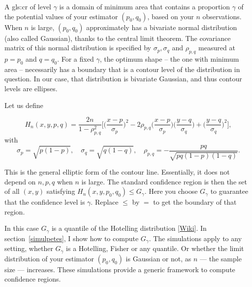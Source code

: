 \documentclass[oneside,10pt]{book}
\begin{document}
A \gls{gls:cr} of level $\gamma$ is a domain of minimum area that contains a proportion $\gamma$ of the potential values of your estimator $(p_0, q_0)$, based on your $n$ observations. When $n$ is large, $(p_0, q_0)$ approximately has a \textcolor{index}{bivariate normal distribution} (also called Gaussian), thanks to the 
\textcolor{index}{central limit theorem}. The \textcolor{index}{covariance matrix} of this normal distribution is specified by $\sigma_p, \sigma_q$ and $\rho_{p,q}$ measured at $p = p_0$ and $q = q_0$. For a fixed $\gamma$, the optimum shape -- the one with minimum area -- necessarily has a boundary that is a contour level of the distribution in question. In our case, that distribution is bivariate Gaussian, and thus contour levels are ellipses.

\noindent Let us define 

\begin{equation}
H_n(x,y,p,q)=\frac{2n}{1-\rho_{p,q}^2}
\Big[\Big( \frac{x-p}{\sigma_p}\Big)^2 
-2\rho_{p,q}\Big(\frac{x-p}{\sigma_p}\Big)\Big(\frac{y-q}{\sigma_q}\Big) 
+ \Big(\frac{y-q}{\sigma_q}\Big)^2\Big],\label{gauss2d}
\end{equation}
with
\begin{equation}
\sigma_p
=\sqrt{p(1-p)},
\quad \sigma_q=\sqrt{q(1-q)},
\quad \rho_{p,q}=-\frac{pq}{\sqrt{pq(1-p)(1-q)}}.\label{cvcxcc}
\end{equation}


This is the general elliptic form of the contour line. Essentially, it does not depend on $n, p, q$ when $n$ is large. The standard confidence region is then the set of all $(x, y)$ satisfying $H_n(x, y, p_0, q_0)\leq G_\gamma$. Here you choose $G_\gamma$ to guarantee that the \textcolor{index}{confidence level} is $\gamma$. Replace $\leq$ by $=$ to get the boundary of that region.

In this case $G_\gamma$ is a \textcolor{index}{quantile} of the \textcolor{index}{Hotelling distribution} [\href{https://en.wikipedia.org/wiki/Hotelling\%27s_T-squared_distribution}{Wiki}].
In section~\ref{simulpetes}, I show how to compute $G_\gamma$. The simulations apply to any setting, whether $G_\gamma$ is a Hotelling, Fisher or any quantile. Or whether the limit distribution of your estimator $(p_0, q_0)$ is Gaussian or not, as $n$ — the sample size — increases. These simulations provide a generic framework to compute confidence regions.
\end{document}
